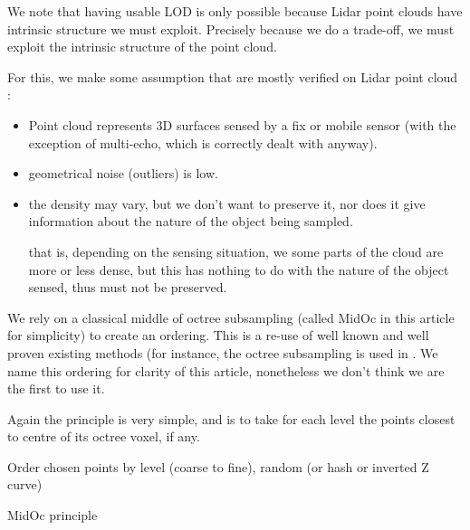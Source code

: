 			We note that having usable LOD is only possible because Lidar point clouds have intrinsic structure we must exploit. 
			Precisely because we do a trade-off, we must exploit the intrinsic structure of the point cloud.
			
			For this, we make some assumption that are mostly verified on Lidar point cloud  :			
			\begin{itemize}
			
				\item Point cloud represents 3D surfaces sensed by a fix or mobile sensor (with the exception of multi-echo, which is correctly dealt with anyway).
				\item geometrical noise (outliers) is low.
				\item the density may vary, but we don't want to preserve it, nor does it give information about the nature of the object being sampled.
				
				that is, depending on the sensing situation, we some parts of the cloud are more or less dense, but this has nothing to do with the nature of the object sensed, thus must not be preserved.
			\end{itemize}
			We rely on a classical middle of octree subsampling (called MidOc in this article for simplicity) to create an ordering. This is a re-use of well known and well proven existing methods (for instance, the octree subsampling is used in \cite{Girardeau-Montaut2014}. 
			We name this ordering for clarity of this article, nonetheless we don't think we are the first to use it.
			
			
			Again the principle is very simple, and is to take for each level the points closest to centre of its octree voxel, if any.
			\begin{algorithm}
				
				Order chosen points by level (coarse to fine), random (or hash or inverted Z curve)\;
				\caption{MidOc principle}
			\end{algorithm} 
			 
